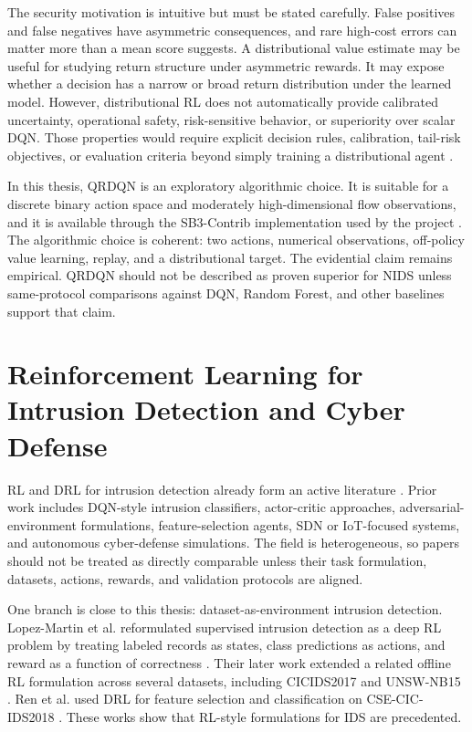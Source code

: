 The security motivation is intuitive but must be stated carefully. False positives and false negatives have asymmetric consequences, and rare high-cost errors can matter more than a mean score suggests. A distributional value estimate may be useful for studying return structure under asymmetric rewards. It may expose whether a decision has a narrow or broad return distribution under the learned model. However, distributional RL does not automatically provide calibrated uncertainty, operational safety, risk-sensitive behavior, or superiority over scalar DQN. Those properties would require explicit decision rules, calibration, tail-risk objectives, or evaluation criteria beyond simply training a distributional agent \parencite{Bellemare2017DistributionalRL,Dabney2018QRDQN}.

In this thesis, QRDQN is an exploratory algorithmic choice. It is suitable for a discrete binary action space and moderately high-dimensional flow observations, and it is available through the SB3-Contrib implementation used by the project \parencite{SB3ContribQRDQNDocs,GymnasiumDocs}. The algorithmic choice is coherent: two actions, numerical observations, off-policy value learning, replay, and a distributional target. The evidential claim remains empirical. QRDQN should not be described as proven superior for NIDS unless same-protocol comparisons against DQN, Random Forest, and other baselines support that claim.

\section{Reinforcement Learning for Intrusion Detection and Cyber Defense}

RL and DRL for intrusion detection already form an active literature \parencite{Yang2024DRLNIDSSurvey,Kheddar2025RLIDSReview,Gueriani2024DRLIoTIDSSurvey,Adawadkar2022CyberSecurityRLSurvey}. Prior work includes DQN-style intrusion classifiers, actor-critic approaches, adversarial-environment formulations, feature-selection agents, SDN or IoT-focused systems, and autonomous cyber-defense simulations. The field is heterogeneous, so papers should not be treated as directly comparable unless their task formulation, datasets, actions, rewards, and validation protocols are aligned.

One branch is close to this thesis: dataset-as-environment intrusion detection. Lopez-Martin et al. reformulated supervised intrusion detection as a deep RL problem by treating labeled records as states, class predictions as actions, and reward as a function of correctness \parencite{LopezMartin2020DRLIDS}. Their later work extended a related offline RL formulation across several datasets, including CICIDS2017 and UNSW-NB15 \parencite{LopezMartin2021RBFOfflineRL}. Ren et al. used DRL for feature selection and classification on CSE-CIC-IDS2018 \parencite{Ren2022IDRDRL}. These works show that RL-style formulations for IDS are precedented.

